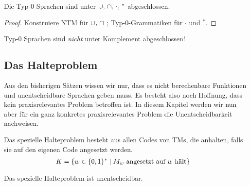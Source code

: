 {\begin{Satz}[name={[Abgeschlossenheit von Typ-0 Sprachen]}]\label{satz:Typ-0-abgeschl}
	Die Typ-0 Sprachen sind unter $\thinmuskip=6mu\cup,\cap,\cdot,{}^*$ abgeschlossen.
\end{Satz}
\begin{proof}
	Konstruiere \ac{NTM} für $\thinmuskip=6mu\cup,\cap$ ; Typ-0-Grammatiken für $\cdot$ und $^*$.
\end{proof}

\begin{Bem}
	Typ-0 Sprachen sind \emph{nicht} unter Komplement abgeschlossen!
\end{Bem}
}



\subsection{Das Halteproblem}
Aus den bisherigen Sätzen wissen wir nur, 
dass es nicht berechenbare Funktionen und unentscheidbare Sprachen geben muss.
Es besteht also noch Hoffnung, dass kein praxisrelevantes Problem betroffen ist.
In diesem Kapitel werden wir nun aber für ein ganz konkretes praxisrelevantes Problem die Unentscheidbarkeit nachweisen.


\begin{Def}[name={[Spezielles Halteproblem]}]
	Das spezielle Halteproblem besteht aus allen Codes von \ac{TM}s, die
	anhalten, falls sie auf den eigenen Code angesetzt werden.
	\begin{align*}
		K &= \{ w \in \{0,1\}^* \mid M_w \text{ angesetzt auf }w\text{
			hält} \}\qedhere
	\end{align*}
\end{Def}


\begin{Satz}[name={[spezielles Halteproblem ist unentscheidbar]}]\label{satz:speziellesHalteproblem}
	Das spezielle Halteproblem ist unentscheidbar.
\end{Satz}


